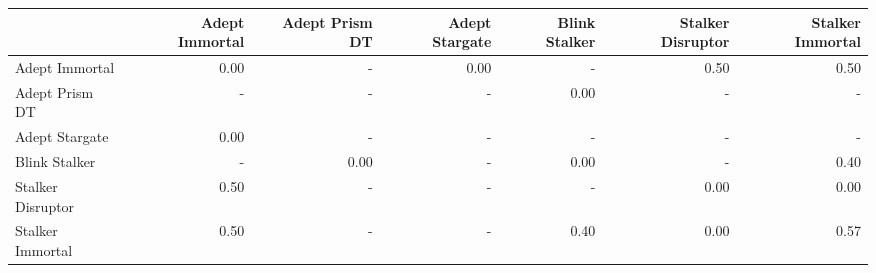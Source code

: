 \begin{tabular}{lrrrrrr}
\toprule
{} &  Adept Immortal &  Adept Prism DT &  Adept Stargate &  Blink Stalker &  Stalker Disruptor &  Stalker Immortal \\
\midrule
Adept Immortal    &            0.00 &             - &            0.00 &            - &               0.50 &              0.50 \\
Adept Prism DT    &             - &             - &             - &           0.00 &                - &               - \\
Adept Stargate    &            0.00 &             - &             - &            - &                - &               - \\
Blink Stalker     &             - &            0.00 &             - &           0.00 &                - &              0.40 \\
Stalker Disruptor &            0.50 &             - &             - &            - &               0.00 &              0.00 \\
Stalker Immortal  &            0.50 &             - &             - &           0.40 &               0.00 &              0.57 \\
\bottomrule
\end{tabular}
